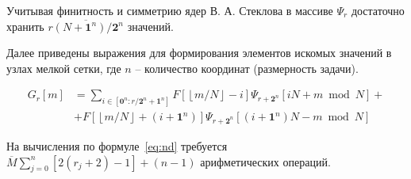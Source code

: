 Учитывая финитность и симметрию ядер В. А. Стеклова
в массиве $\Psi_{r}$ достаточно хранить $\overline{r(N+\mathbf{1}^n)/ \mathbf{2}^n}$
значений.



Далее приведены выражения для формирования
элементов искомых значений в узлах мелкой сетки,
где $n$ -- количество координат (размерность задачи).


\begin{equation}
  \label{eq:nd}
  \begin{split}
    G_r[m] &= 
    \sum_{i \in  [\mathbf{0}^n:r/\mathbf{2}^n + \mathbf{1}^n]} 
        F \left[ \left \lfloor {m}/{N} \right \rfloor - i\right]
      \Psi_{r+\mathbf{2}^n}[iN + m\bmod N] 
       + \\
    &  +
      F \left[\left\lfloor m/N \right \rfloor + (i+\mathbf{1}^n)  \right]
      \Psi_{r+\mathbf{2}^n}[(i+\mathbf{1}^n)N - m \bmod N]
  \end{split}
\end{equation}

На вычисления по формуле~\eqref{eq:nd} требуется
$\overline{M}\sum_{j=0}^n [2(r_j+2)-1] + (n-1)$ 
арифметических операций.




